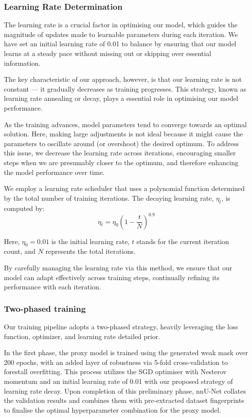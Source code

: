 \subsubsection*{Learning Rate Determination}
The learning rate is a crucial factor in optimising our model, which guides the magnitude of updates made to learnable parameters during each iteration. We have set an initial learning rate of 0.01 to balance by ensuring that our model learns at a steady pace without missing out or skipping over essential information.

The key characteristic of our approach, however, is that our learning rate is not constant — it gradually decreases as training progresses. This strategy, known as learning rate annealing or decay, plays a essential role in optimising our model performance.

As the training advances, model parameters tend to converge towards an optimal solution. Here, making large adjustments is not ideal because it might cause the parameters to oscillate around (or overshoot) the desired optimum. To address this issue, we decrease the learning rate across iterations, encouraging smaller steps when we are presumably closer to the optimum, and therefore enhancing the model performance over time.

We employ a learning rate scheduler that uses a polynomial function determined by the total number of training iterations. The decaying learning rate, \( \eta_{t} \), is computed by:
\[
\eta_{t} = \eta_{0}(1 - \frac{t}{N})^{0.9}
\]

Here, \( \eta_{0} = 0.01 \) is the initial learning rate, \( t \) stands for the current iteration count, and \( N \) represents the total iterations.

By carefully managing the learning rate via this method, we ensure that our model can adapt effectively across training steps, continually refining its performance with each iteration.

\subsubsection*{Two-phased training}
Our training pipeline adopts a two-phased strategy, heavily leveraging the loss function, optimizer, and learning rate detailed prior.

In the first phase, the proxy model is trained using the generated weak mask over 200 epochs, with an added layer of robustness via 5-fold cross-validation to forestall overfitting. This process utilizes the SGD optimiser with Nesterov momentum and an initial learning rate of 0.01 with our proposed strategy of learning rate decay. Upon completion of this preliminary phase, nnU-Net collates the validation results and combines them with pre-extracted dataset fingerprints to finalise the optimal hyperparameter combination for the proxy model.

